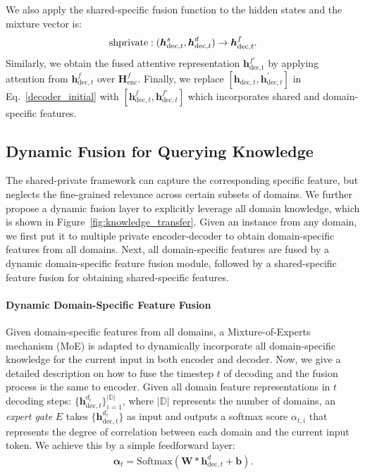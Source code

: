 \documentclass[11pt,a4paper]{article}
\newcommand{\shprivate}{{\rm{shprivate}}}
\begin{document}
We also apply the shared-specific fusion function to the hidden states and the mixture vector is:
\begin{eqnarray}
	\shprivate : (\boldsymbol{h}_{{\text{dec}, t}}^{s}, \boldsymbol{h}_{{\text{dec}, t}}^{d}) \rightarrow \boldsymbol{h}_{{\text{dec}, t}}^{f}.
\end{eqnarray}
Similarly, we obtain the fused attentive representation ${\boldsymbol{h}}^{f'}_\text{dec,t}$ by applying attention from  $\boldsymbol{h}_{\text{dec}, t}^{f}$ over $\boldsymbol{H}_\text{enc}^{f}$.
Finally, we replace $[\boldsymbol{h}^{}_{\text{dec}, t}, \boldsymbol{h}^{'}_{\text{dec}, t}]$ in Eq.~\ref{decoder_initial} with $[ \boldsymbol{h}_{\text{dec}, t}^{f},{\boldsymbol{h}}^{f'}_{\text{dec}, t}]$ which incorporates shared and domain-specific features.

\subsection{Dynamic Fusion for Querying Knowledge} \label{sec:moe}
The shared-private framework can capture the corresponding specific feature, but neglects the fine-grained relevance across certain subsets of domains.
We further propose a dynamic fusion layer to explicitly leverage all domain knowledge, which is shown in Figure~\ref{fig:knowledge_transfer}.
Given an instance from any domain, we first put it to multiple private encoder-decoder to obtain domain-specific features from all domains.
Next, all domain-specific features are fused by a dynamic domain-specific feature fusion module, followed by a shared-specific feature fusion for obtaining shared-specific features.
\paragraph{Dynamic Domain-Specific Feature Fusion}
Given domain-specific features from all domains, a Mixture-of-Experts mechanism (MoE) \cite{guo-etal-2018-multi} is adapted to dynamically incorporate all domain-specific knowledge for the current input in both encoder and decoder. 
Now, we give a detailed description on how to fuse the timestep $t$ of decoding and the fusion process is the same to encoder.
Given all domain feature representations in $t$ decoding steps: $\{\boldsymbol{h}_{{\text{dec}, t}}^{d_{i}}\}_{i=1}^{|\mathbb {D}|}$, where $|\mathbb {D}|$ represents the number of domains,
an \emph{expert gate} $E$ takes $\{\boldsymbol{h}_{{\text{dec}, t}}^{d_{i}}\}$ as input and outputs a softmax score $\alpha_{t, i}$ that represents the degree of correlation between each domain and the current input token.
We achieve this by a simple feedforward layer:
\begin{eqnarray} \label{moe}
	\boldsymbol{\alpha}_t = \text{Softmax}( \boldsymbol{W}*\boldsymbol{h}_{{\text{dec}, t}}^{d} + \boldsymbol{b}).
\end{eqnarray}
\end{document}
